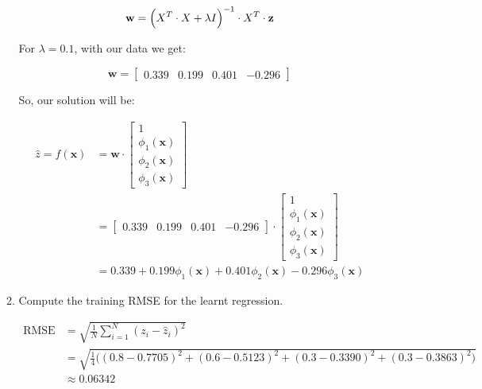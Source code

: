 \documentclass[12pt]{article}
\begin{document}
\begin{enumerate}[leftmargin=\labelsep]
\begin{enumerate}
        \begin{equation}
            \mathbf{w} = \Bigl(  X^T \cdot X + \lambda I\Bigr)^{-1} \cdot X^T \cdot \mathbf{z}
        \end{equation}

        For $\lambda = 0.1$, with our data we get:

        \begin{equation}
            \mathbf{w} = \begin{bmatrix}
                0.339 & 0.199 & 0.401 & -0.296
            \end{bmatrix}
        \end{equation}

        So, our solution will be:

        \begin{equation}
        \begin{split}
            \hat{z} = f(\mathbf{x}) &= \mathbf{w} \cdot
            \begin{bmatrix}
                1 \\
                \phi_1(\mathbf{x}) \\
                \phi_2(\mathbf{x}) \\
                \phi_3(\mathbf{x})
            \end{bmatrix} \\
            &= \begin{bmatrix}
                0.339 & 0.199 & 0.401 & -0.296
            \end{bmatrix} \cdot \begin{bmatrix}
                1 \\
                \phi_1(\mathbf{x}) \\
                \phi_2(\mathbf{x}) \\
                \phi_3(\mathbf{x})
            \end{bmatrix} \\
            &= 0.339 + 0.199\phi_1(\mathbf{x}) + 0.401\phi_2(\mathbf{x}) - 0.296\phi_3(\mathbf{x})
        \end{split}
        \end{equation}

        \item Compute the training RMSE for the learnt regression.
        
        \begin{equation}
        \begin{split}
            \textrm{RMSE} &= \sqrt{\frac{1}{N}\sum_{i=1}^{N}(z_i-\hat{z}_i)^2} \\
            &= \sqrt{\frac{1}{4}\biggl( (0.8-0.7705)^2 + (0.6-0.5123)^2 + (0.3-0.3390)^2 + (0.3-0.3863)^2\biggr)} \\
            &\approx 0.06342
        \end{split}
        \end{equation}
    \end{enumerate}


\end{enumerate}
\end{document}
